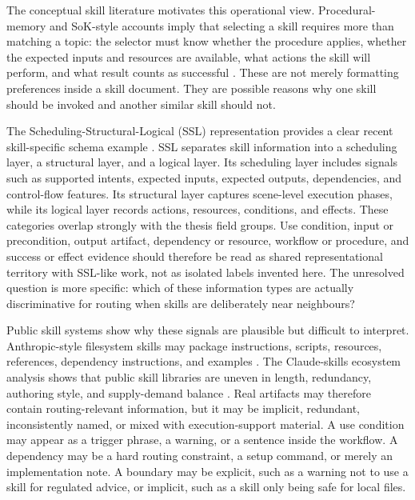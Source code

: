 The conceptual skill literature motivates this operational view. Procedural-memory and SoK-style accounts imply that selecting a skill requires more than matching a topic: the selector must know whether the procedure applies, whether the expected inputs and resources are available, what actions the skill will perform, and what result counts as successful \cite{jiang2026procedural,jiang2026sok}. These are not merely formatting preferences inside a skill document. They are possible reasons why one skill should be invoked and another similar skill should not.

The Scheduling-Structural-Logical (SSL) representation provides a clear recent skill-specific schema example \cite{liang2026ssl}. SSL separates skill information into a scheduling layer, a structural layer, and a logical layer. Its scheduling layer includes signals such as supported intents, expected inputs, expected outputs, dependencies, and control-flow features. Its structural layer captures scene-level execution phases, while its logical layer records actions, resources, conditions, and effects. These categories overlap strongly with the thesis field groups. Use condition, input or precondition, output artifact, dependency or resource, workflow or procedure, and success or effect evidence should therefore be read as shared representational territory with SSL-like work, not as isolated labels invented here. The unresolved question is more specific: which of these information types are actually discriminative for routing when skills are deliberately near neighbours?

Public skill systems show why these signals are plausible but difficult to interpret. Anthropic-style filesystem skills may package instructions, scripts, resources, references, dependency instructions, and examples \cite{anthropic2025skills}. The Claude-skills ecosystem analysis shows that public skill libraries are uneven in length, redundancy, authoring style, and supply-demand balance \cite{ling2026claudeskills}. Real artifacts may therefore contain routing-relevant information, but it may be implicit, redundant, inconsistently named, or mixed with execution-support material. A use condition may appear as a trigger phrase, a warning, or a sentence inside the workflow. A dependency may be a hard routing constraint, a setup command, or merely an implementation note. A boundary may be explicit, such as a warning not to use a skill for regulated advice, or implicit, such as a skill only being safe for local files.


